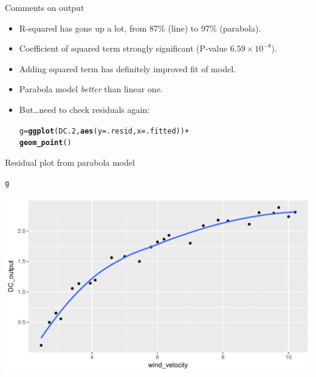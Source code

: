 \documentclass[unknownkeysallowed]{beamer}\usepackage[]{graphicx}\usepackage[]{color}
\makeatletter
\def\maxwidth{ %
  \ifdim\Gin@nat@width>\linewidth
    \linewidth
  \else
    \Gin@nat@width
  \fi
}
\newcommand{\hlopt}[1]{\textcolor[rgb]{0,0,0}{#1}}%
\newcommand{\hlstd}[1]{\textcolor[rgb]{0.345,0.345,0.345}{#1}}%
\newcommand{\hlkwb}[1]{\textcolor[rgb]{0.69,0.353,0.396}{#1}}%
\newcommand{\hlkwc}[1]{\textcolor[rgb]{0.333,0.667,0.333}{#1}}%
\newcommand{\hlkwd}[1]{\textcolor[rgb]{0.737,0.353,0.396}{\textbf{#1}}}%
\newenvironment{kframe}{%
 \def\at@end@of@kframe{}%
 \ifinner\ifhmode%
  \def\at@end@of@kframe{\end{minipage}}%
  \begin{minipage}{\columnwidth}%
 \fi\fi%
 \def\FrameCommand##1{\hskip\@totalleftmargin \hskip-\fboxsep
 \colorbox{shadecolor}{##1}\hskip-\fboxsep
     \hskip-\linewidth \hskip-\@totalleftmargin \hskip\columnwidth}%
 \MakeFramed {\advance\hsize-\width
   \@totalleftmargin\z@ \linewidth\hsize
   \@setminipage}}%
 {\par\unskip\endMakeFramed%
 \at@end@of@kframe}
\newenvironment{knitrout}{}{} %
\makeatother
\begin{document}
\begin{frame}[fragile]{Comments on output}

  \begin{itemize}
  \item R-squared has gone up a lot, from 87\% (line) to 97\% (parabola).
  \item Coefficient of squared term strongly significant (P-value
    $6.59 \times 10^{-8}$).
  \item Adding squared term has definitely improved fit of model.
  \item Parabola model \emph{better} than linear one.
  \item But\ldots need to check residuals again:

\begin{knitrout}
\color{fgcolor}\begin{kframe}
\begin{alltt}
\hlstd{g}\hlkwb{=}\hlkwd{ggplot}\hlstd{(DC.2,}\hlkwd{aes}\hlstd{(}\hlkwc{y}\hlstd{=.resid,}\hlkwc{x}\hlstd{=.fitted))}\hlopt{+}
  \hlkwd{geom_point}\hlstd{()}
\end{alltt}
\end{kframe}
\end{knitrout}

  \end{itemize}

\end{frame}

\begin{frame}[fragile]{Residual plot from parabola model}

\begin{knitrout}
\color{fgcolor}\begin{kframe}
\begin{alltt}
\hlstd{g}
\end{alltt}
\end{kframe}
\includegraphics[width=\maxwidth]{figure/unnamed-chunk-240-1} 

\end{knitrout}


\end{frame}
\end{document}
